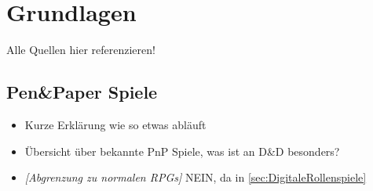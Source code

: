 \chapter{Grundlagen}
\label{background}

Alle Quellen hier referenzieren!




\section{Pen\&Paper Spiele}
\label{sec:PenPaperSpiele}

\begin{itemize}
	\item Kurze Erklärung wie so etwas abläuft
	\item Übersicht über bekannte PnP Spiele, was ist an D\&D besonders?
	\item \textit{[Abgrenzung zu normalen RPGs]} NEIN, da in \ref{sec:DigitaleRollenspiele}
\end{itemize}


